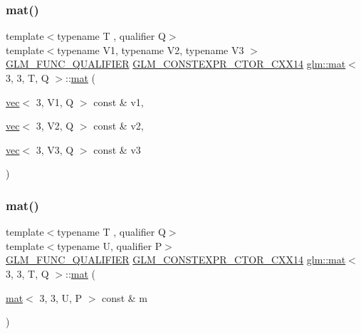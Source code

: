 \subsubsection{\texorpdfstring{mat()}{mat()}\hspace{0.1cm}{\footnotesize\ttfamily [20/21]}}
{\footnotesize\ttfamily template$<$typename T , qualifier Q$>$ \\
template$<$typename V1, typename V2, typename V3 $>$ \\
\mbox{\hyperlink{setup_8hpp_a33fdea6f91c5f834105f7415e2a64407}{G\+L\+M\+\_\+\+F\+U\+N\+C\+\_\+\+Q\+U\+A\+L\+I\+F\+I\+ER}} \mbox{\hyperlink{setup_8hpp_a0900f9145e68bf6061b6f5e7be3fa751}{G\+L\+M\+\_\+\+C\+O\+N\+S\+T\+E\+X\+P\+R\+\_\+\+C\+T\+O\+R\+\_\+\+C\+X\+X14}} \mbox{\hyperlink{structglm_1_1mat}{glm\+::mat}}$<$ 3, 3, T, Q $>$\+::\mbox{\hyperlink{structglm_1_1mat}{mat}} (\begin{DoxyParamCaption}\item[{\mbox{\hyperlink{structglm_1_1vec}{vec}}$<$ 3, V1, Q $>$ const \&}]{v1,  }\item[{\mbox{\hyperlink{structglm_1_1vec}{vec}}$<$ 3, V2, Q $>$ const \&}]{v2,  }\item[{\mbox{\hyperlink{structglm_1_1vec}{vec}}$<$ 3, V3, Q $>$ const \&}]{v3 }\end{DoxyParamCaption})}

\mbox{\label{structglm_1_1mat_3_013_00_013_00_01_t_00_01_q_01_4_ad2ae09a7a8a55aa735691eaf3dad3e0f}} 
\subsubsection{\texorpdfstring{mat()}{mat()}\hspace{0.1cm}{\footnotesize\ttfamily [21/21]}}
{\footnotesize\ttfamily template$<$typename T , qualifier Q$>$ \\
template$<$typename U, qualifier P$>$ \\
\mbox{\hyperlink{setup_8hpp_a33fdea6f91c5f834105f7415e2a64407}{G\+L\+M\+\_\+\+F\+U\+N\+C\+\_\+\+Q\+U\+A\+L\+I\+F\+I\+ER}} \mbox{\hyperlink{setup_8hpp_a0900f9145e68bf6061b6f5e7be3fa751}{G\+L\+M\+\_\+\+C\+O\+N\+S\+T\+E\+X\+P\+R\+\_\+\+C\+T\+O\+R\+\_\+\+C\+X\+X14}} \mbox{\hyperlink{structglm_1_1mat}{glm\+::mat}}$<$ 3, 3, T, Q $>$\+::\mbox{\hyperlink{structglm_1_1mat}{mat}} (\begin{DoxyParamCaption}\item[{\mbox{\hyperlink{structglm_1_1mat}{mat}}$<$ 3, 3, U, P $>$ const \&}]{m }\end{DoxyParamCaption})}



